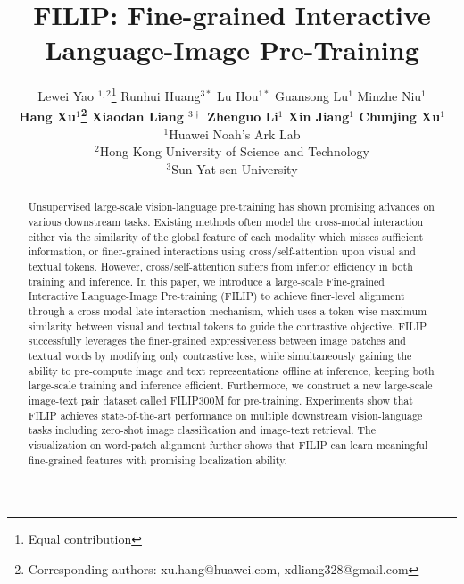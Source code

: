 \documentclass{article} %
\title{FILIP: Fine-grained Interactive Language-Image Pre-Training}
\author{Lewei Yao $^{1,2}$\thanks{Equal contribution} 
\hspace{3mm}Runhui Huang$^{3*}$ 
\hspace{3mm}Lu Hou$^{1*}$ 
\hspace{3mm}Guansong Lu$^{1}$ 
\hspace{3mm}Minzhe Niu$^{1}$ \\
\textbf{
\hspace{-1mm}Hang Xu$^{1}$\thanks{Corresponding authors: xu.hang@huawei.com, xdliang328@gmail.com}
\hspace{3mm}Xiaodan Liang $^{3\dag}$ 
\hspace{3mm}Zhenguo Li$^{1}$ 
\hspace{3mm}Xin Jiang$^{1}$ 
\hspace{3mm}Chunjing Xu$^{1}$} \\ 
\hspace{0.03in} $^{1}$Huawei Noah’s Ark Lab \\ 
\hspace{0.03in} $^{2}$Hong Kong University of Science and Technology \\ 
\hspace{0.03in} $^{3}$Sun Yat-sen University\\
}
\begin{document}
\maketitle

\begin{abstract}

Unsupervised large-scale vision-language pre-training has shown promising advances on various downstream tasks. Existing methods often  model the cross-modal interaction either via the similarity of the global feature of each modality which misses sufficient information, or finer-grained interactions using cross/self-attention upon visual  and textual tokens. However, cross/self-attention suffers from inferior efficiency in both training and inference. In this paper, we introduce a large-scale Fine-grained Interactive Language-Image Pre-training (FILIP) to achieve finer-level alignment through a cross-modal late interaction mechanism, which uses a token-wise maximum similarity between visual and textual tokens to guide the contrastive objective. FILIP successfully leverages the finer-grained expressiveness between image patches and textual words by modifying only contrastive loss, while simultaneously gaining the ability to pre-compute image and text representations offline at inference, keeping both large-scale training and inference efficient. Furthermore, we construct a new large-scale image-text pair dataset called FILIP300M for pre-training. Experiments show that FILIP achieves state-of-the-art performance on multiple downstream vision-language tasks including zero-shot image classification and image-text retrieval. The visualization on word-patch alignment further shows that FILIP can learn meaningful fine-grained features with promising localization ability. 


\end{abstract}
\end{document}

